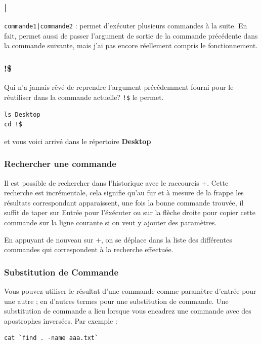 \documentclass[a4paper,twoside]{article}
\begin{document}
\subsubsection{|}
\verb#commande1|commande2# : permet d'exécuter plusieurs commandes à la suite. En fait, permet aussi de passer l'argument de sortie de la commande précédente dans la commande suivante, mais j'ai pas encore réellement compris le fonctionnement.

\subsubsection{!\$}

Qui n'a jamais rêvé de reprendre l'argument précédemment fourni pour le réutiliser dans la commande actuelle? \verb|!$| le permet.

\begin{verbatim}
ls Desktop
cd !$
\end{verbatim}


et vous voici arrivé dans le répertoire \textbf{Desktop}

\subsubsection{Rechercher une commande}
Il est possible de rechercher dans l'historique avec le raccourcis +. Cette recherche est incrémentale, cela signifie qu'au fur et à mesure de la frappe les résultats correspondant apparaissent, une fois la bonne commande trouvée, il suffit de taper sur Entrée pour l'éxécuter ou sur la flèche droite pour copier cette commande sur la ligne courante si on veut y ajouter des paramètres.

\begin{remarque}
En appuyant de nouveau sur +, on se déplace dans la liste des différentes commandes qui correspondent à la recherche effectuée.
\end{remarque}


\subsubsection{Substitution de Commande}
Vous pouvez utiliser le résultat d'une commande comme paramètre d'entrée pour une autre ; en d'autres termes pour une substitution de commande. Une substitution de commande a lieu lorsque vous encadrez une commande avec des apostrophes inversées. Par exemple :

\begin{verbatim}
cat `find . -name aaa.txt`
\end{verbatim}
\end{document}
